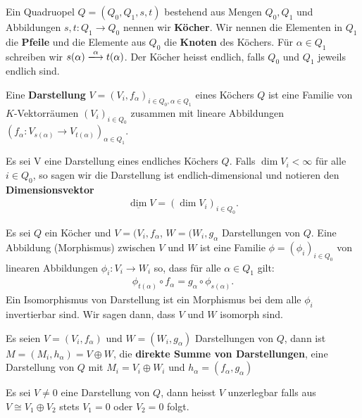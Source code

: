 \documentclass[../Algebra_scipt.tex]{subfiles}
\begin{document}
    \begin{definition}[Köcher]
        Ein Quadruopel $Q = (Q_0, Q_1, s, t)$ bestehend aus Mengen $Q_0, Q_1$ und Abbildungen $s,t: Q_1 \to Q_0$ nennen wir \textbf{Köcher}. Wir nennen die
        Elementen in $Q_1$ die \textbf{Pfeile} und die Elemente aus $Q_0$ die \textbf{Knoten} des Köchers. Für $\alpha \in Q_1$ schreiben wir $s(\alpha)
        \xlongrightarrow{\alpha} t(\alpha)$. Der Köcher heisst endlich, falls $Q_0$ und $Q_1$ jeweils endlich sind.
    \end{definition}

    \begin{definition}[Darstellung]
        Eine \textbf{Darstellung} $V = (V_{i}, f_{\alpha})_{i\in Q_0, \alpha \in Q_1}$ eines Köchers $Q$ ist eine Familie von $K$-Vektorräumen $(V_{i})_{i\in
        Q_0}$ zusammen mit lineare Abbildungen $\left(f_{\alpha}:V_{s(\alpha)} \to V_{t(\alpha)}  \right)_{\alpha \in Q_1} $.
    \end{definition}

    \begin{definition}
        Es sei V eine Darstellung eines endliches Köchers $Q$. Falls $\dim V_{i} < \infty$ für alle $i \in Q_0$, so sagen wir die Darstellung ist
        endlich-dimensional und notieren den \textbf{Dimensionsvektor}
        \begin{align*}
            \underline{\dim} V = \left(\dim V_{i}\right)_{i\in Q_0}
        .\end{align*}
    \end{definition}

    \begin{definition}[Morphismus]
        Es sei $Q$ ein Köcher und $V = (V_{i}, f_{\alpha}$, $W = (W_{i}, g_{\alpha}$ Darstellungen von $Q$. Eine Abbildung (Morphismus) zwischen $V$ und $W$ ist
        eine Familie $\phi = (\phi_{i})_{i\in Q_0}$ von linearen Abbildungen $\phi_{i}: V_{i}\to W_{i}$ so, dass für alle $\alpha \in Q_1$ gilt:
        \begin{align*}
            \phi_{t(\alpha)} \circ f_{\alpha} = g_{\alpha} \circ \phi_{s(\alpha)}
        .\end{align*}
        Ein Isomorphismus von Darstellung ist ein Morphismus bei dem alle $\phi_{i}$ invertierbar sind. Wir sagen dann, dass $V$ und $W$ isomorph sind.
    \end{definition}

    \begin{definition}
        Es seien $V = (V_{i}, f_{\alpha})$ und $W = (W_{i}, g_{\alpha})$ Darstellungen von $Q$, dann ist $M = (M_{i}, h_{\alpha}) = V \oplus W$, die
        \textbf{direkte Summe von Darstellungen}, eine Darstellung von $Q$ mit $M_{i} = V_{i} \oplus W_{i}$ und $h_{\alpha} = (f_{\alpha}, g_{\alpha})$
    \end{definition}

    \begin{definition}
        Es sei $V \neq 0$ eine Darstellung von $Q$, dann heisst $V$ unzerlegbar falls aus $V \cong  V_1 \oplus V_2$ stets $V_1 =0$ oder $V_2 = 0$ folgt.
    \end{definition}
\end{document}
